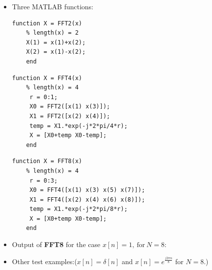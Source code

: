 \documentclass[onecolumn,oneside]{SUSTechHomework}
\begin{document}
\begin{itemize}
	(N/2) multiplications. 
	\item Three MATLAB functions:
\begin{lstlisting}[title=\textbf{FFT2.m}]
	function X = FFT2(x)
	% length(x) = 2
	X(1) = x(1)+x(2);
	X(2) = x(1)-x(2);
	end		
\end{lstlisting}
\begin{lstlisting}[title=\textbf{FFT4.m}]
	function X = FFT4(x)
	% length(x) = 4
	 r = 0:1;
	 X0 = FFT2([x(1) x(3)]);  
	 X1 = FFT2([x(2) x(4)]); 
	 temp = X1.*exp(-j*2*pi/4*r);
	 X = [X0+temp X0-temp];
	end	
\end{lstlisting}
\begin{lstlisting}[title=\textbf{FFT8.m}]
	function X = FFT8(x)
	% length(x) = 4
	 r = 0:3;
	 X0 = FFT4([x(1) x(3) x(5) x(7)]);
	 X1 = FFT4([x(2) x(4) x(6) x(8)]); 
	 temp = X1.*exp(-j*2*pi/8*r);
	 X = [X0+temp X0-temp];
	end
\end{lstlisting}
	\item Output of \textbf{FFT8} for the case $x[n]=1,\ \text{for}\ N=8$:
	\begin{center}
	\end{center}
	\item Other test examples:($x[n]=\delta[n]$ and $x[n]=e^{\frac{j2\pi n}{8}}$ for $N=8$.)
	\begin{center}
	\end{center}
	\begin{center}
\end{center}
\end{itemize}
\end{document}
